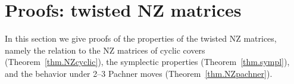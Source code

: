 \documentclass[12pt,reqno]{amsart}
\theoremstyle{definition}
\begin{document}


\section{Proofs: twisted NZ matrices}
\label{sec.part1}

In this section we give proofs of the properties of the twisted NZ
matrices, namely the relation to the NZ matrices of cyclic covers
(Theorem~\ref{thm.NZcyclic}), the symplectic properties (Theorem~\ref{thm.sympl}),
and the behavior under 2--3 Pachner moves (Theorem~\ref{thm.NZpachner}).
\end{document}
